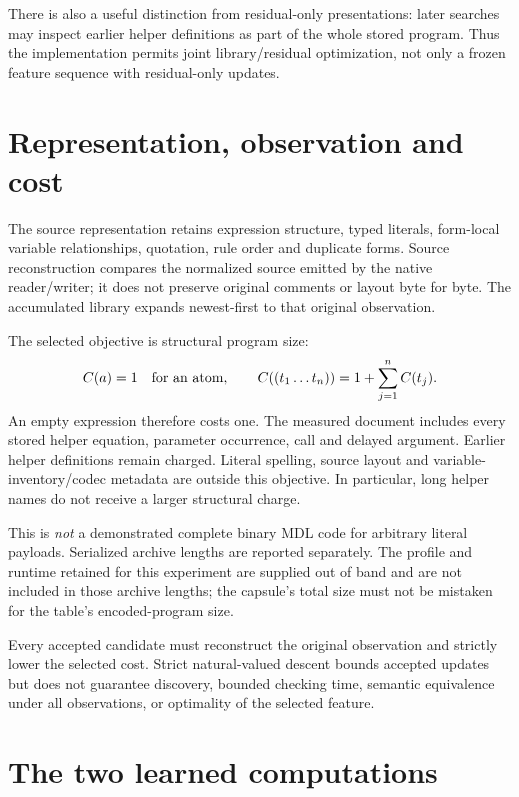 \documentclass[11pt,a4paper]{article}
\begin{document}
There is also a useful distinction from residual-only presentations: later
searches may inspect earlier helper definitions as part of the whole stored
program. Thus the implementation permits joint library/residual optimization,
not only a frozen feature sequence with residual-only updates.

\section{Representation, observation and cost}

The source representation retains expression structure, typed literals,
form-local variable relationships, quotation, rule order and duplicate forms.
Source reconstruction compares the normalized source emitted by the native
reader/writer; it does not preserve original comments or layout byte for byte.
The accumulated library expands newest-first to that original observation.

The selected objective is structural program size:
\[
 C(a)=1 \quad\hbox{for an atom},\qquad
 C((t_1\ldots t_n))=1+\sum_{j=1}^n C(t_j).
\]
An empty expression therefore costs one. The measured document includes every
stored helper equation, parameter occurrence, call and delayed argument.
Earlier helper definitions remain charged. Literal spelling, source layout
and variable-inventory/codec metadata are outside this objective. In particular,
long helper names do not receive a larger structural charge.

This is \emph{not} a demonstrated complete binary MDL code for arbitrary
literal payloads. Serialized archive lengths are reported separately. The
profile and runtime retained for this experiment are supplied out of band and
are not included in those archive lengths; the capsule's total size must not
be mistaken for the table's encoded-program size.

Every accepted candidate must reconstruct the original observation and
strictly lower the selected cost. Strict natural-valued descent bounds accepted
updates but does not guarantee discovery, bounded checking time, semantic
equivalence under all observations, or optimality of the selected feature.

\section{The two learned computations}
\end{document}
